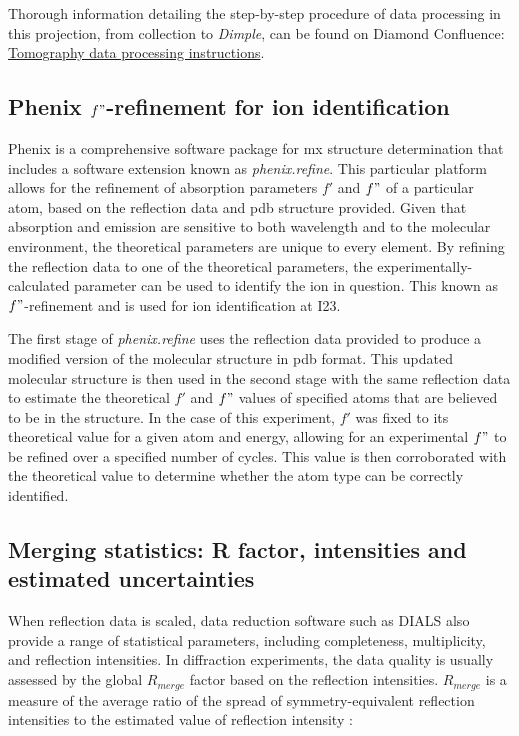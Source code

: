Thorough information detailing the step-by-step procedure of data processing in this projection, from collection to \textit{Dimple}, can be found on Diamond Confluence: \href{https://confluence.diamond.ac.uk/x/yIWuD}{Tomography data processing instructions}. %

\subsection{Phenix $f"$-refinement for ion identification}

Phenix is a comprehensive software package for \ac{mx} structure determination that includes a software extension known as \textit{phenix.refine}. This particular platform allows for the refinement of absorption parameters $f'$ and $f"$ of a particular atom, based on the reflection data and \ac{pdb} structure provided. Given that absorption and emission are sensitive to both wavelength and to the molecular environment, the theoretical parameters are unique to every element. By refining the reflection data to one of the theoretical parameters, the experimentally-calculated parameter can be used to identify the ion in question. This known as $f"$-refinement and is used for ion identification at I23.

The first stage of \textit{phenix.refine} uses the reflection data provided to produce a modified version of the molecular structure in \ac{pdb} format. This updated molecular structure is then used in the second stage with the same reflection data to estimate the theoretical $f'$ and $f"$ values of specified atoms that are believed to be in the structure. In the case of this experiment, $f'$ was fixed to its theoretical value for a given atom and energy, allowing for an experimental $f"$ to be refined over a specified number of cycles. This value is then corroborated with the theoretical value to determine whether the atom type can be correctly identified.%

\subsection{Merging statistics: R factor, intensities and estimated uncertainties}

When reflection data is scaled, data reduction software such as DIALS also provide a range of statistical parameters, including completeness, multiplicity, and reflection intensities. In diffraction experiments, the data quality is usually assessed by the global $R_{merge}$ factor based on the reflection intensities. $R_{merge}$ is a measure of the average ratio of the spread of symmetry-equivalent reflection intensities to the estimated value of reflection intensity \cite{Dauter1999}:

